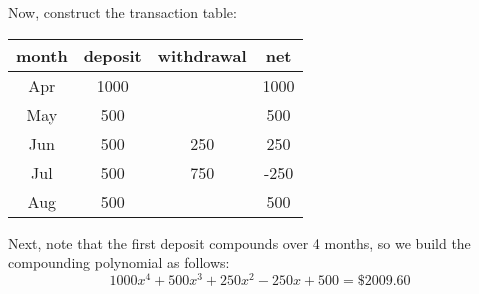 \documentclass[letterpaper,12pt,fleqn]{article}
\begin{document}
\begin{enumerate}
  Now, construct the transaction table:

  \begin{tabular}{|c|c|c|c|}
    \hline
    month & deposit & withdrawal & net \\
    \hline
    Apr & 1000 & & 1000 \\
    \hline
    May & 500 & & 500 \\
    \hline
    Jun & 500 & 250 & 250 \\
    \hline
    Jul & 500 & 750 & -250 \\
    \hline
    Aug & 500 & & 500 \\
    \hline
  \end{tabular}

  Next, note that the first deposit compounds over 4 months, so we build the compounding polynomial as follows:
  \[1000x^4+500x^3+250x^2-250x+500=\$2009.60\]
\end{enumerate}
\end{document}
